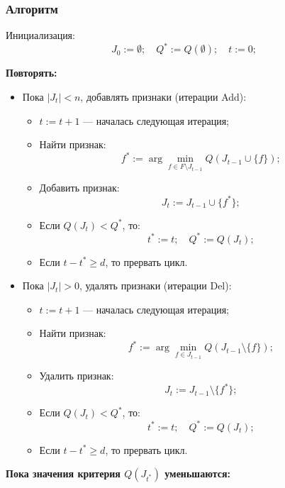 \subsubsection*{Алгоритм}


Инициализация:
\[
    J_0 := \emptyset; \quad Q^* := Q(\emptyset); \quad t := 0;
\]

\textbf{Повторять:}
\begin{itemize}
    \item Пока \( |J_t| < n \), добавлять признаки (итерации Add):
          \begin{itemize}
              \item \( t := t + 1 \) — началась следующая итерация;
              \item Найти признак:
                    \[
                        f^* := \arg \min_{f \in F \setminus J_{t-1}} Q(J_{t-1} \cup \{f\});
                    \]
              \item Добавить признак:
                    \[
                        J_t := J_{t-1} \cup \{f^*\};
                    \]
              \item Если \( Q(J_t) < Q^* \), то:
                    \[
                        t^* := t; \quad Q^* := Q(J_t);
                    \]
              \item Если \( t - t^* \geq d \), то прервать цикл.
          \end{itemize}
    \item Пока \( |J_t| > 0 \), удалять признаки (итерации Del):
          \begin{itemize}
              \item \( t := t + 1 \) — началась следующая итерация;
              \item Найти признак:
                    \[
                        f^* := \arg \min_{f \in J_{t-1}} Q(J_{t-1} \setminus \{f\});
                    \]
              \item Удалить признак:
                    \[
                        J_t := J_{t-1} \setminus \{f^*\};
                    \]
              \item Если \( Q(J_t) < Q^* \), то:
                    \[
                        t^* := t; \quad Q^* := Q(J_t);
                    \]
              \item Если \( t - t^* \geq d \), то прервать цикл.
          \end{itemize}
\end{itemize}

\textbf{Пока значения критерия \( Q(J_{t^*}) \) уменьшаются:}

